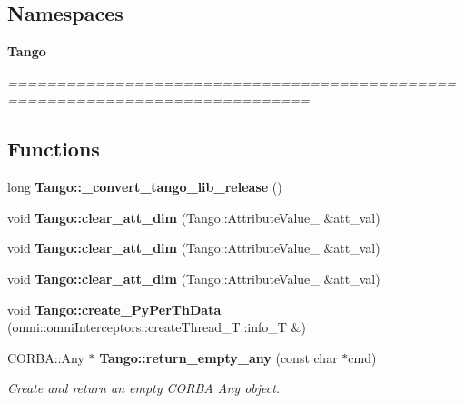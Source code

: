 \subsection*{Namespaces}
\begin{DoxyCompactItemize}
\item 
{\bf Tango}
\begin{DoxyCompactList}\small\item\em ============================================================================= \end{DoxyCompactList}\end{DoxyCompactItemize}
\subsection*{Functions}
\begin{DoxyCompactItemize}
\item 
long {\bf Tango\-::\-\_\-convert\-\_\-tango\-\_\-lib\-\_\-release} ()
\item 
void {\bf Tango\-::clear\-\_\-att\-\_\-dim} (Tango\-::\-Attribute\-Value\-\_ \&att\-\_\-val)
\item 
void {\bf Tango\-::clear\-\_\-att\-\_\-dim} (Tango\-::\-Attribute\-Value\-\_ \&att\-\_\-val)
\item 
void {\bf Tango\-::clear\-\_\-att\-\_\-dim} (Tango\-::\-Attribute\-Value\-\_ \&att\-\_\-val)
\item 
void {\bf Tango\-::create\-\_\-\-Py\-Per\-Th\-Data} (omni\-::omni\-Interceptors\-::create\-Thread\-\_\-\-T\-::info\-\_\-\-T \&)
\item 
C\-O\-R\-B\-A\-::\-Any $\ast$ {\bf Tango\-::return\-\_\-empty\-\_\-any} (const char $\ast$cmd)
\begin{DoxyCompactList}\small\item\em Create and return an empty C\-O\-R\-B\-A Any object. \end{DoxyCompactList}\end{DoxyCompactItemize}
